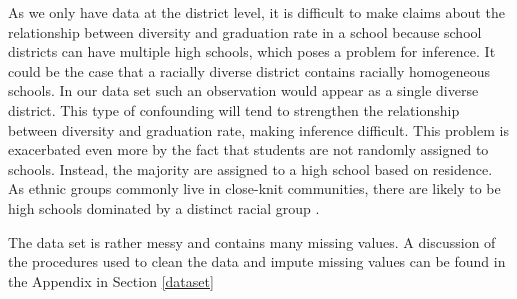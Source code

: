 \documentclass{article}
\begin{document}
As we only have data at the district level, it is difficult to make claims about the relationship between diversity and graduation rate in a school because school districts can have multiple high schools, which poses a problem for inference. It could be the case that a racially diverse district contains racially homogeneous schools. In our data set such an observation would appear as a single diverse district.  This type of confounding will tend to strengthen the relationship between diversity and graduation rate, making inference difficult. This problem is exacerbated even more by the fact that students are not randomly assigned to schools. Instead, the majority are assigned to a high school based on residence. As ethnic groups commonly live in close-knit communities, there are likely to be high schools dominated by a distinct racial group \cite{paper3}. 

The data set is rather messy and contains many missing values. A discussion of the procedures used to clean the data and impute missing values can be found in the Appendix in Section \ref{dataset}
\end{document}
